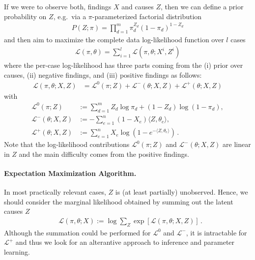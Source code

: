 \documentclass{article}
\newcommand{\loglike}{{\mathcal L}}
\begin{document}
If we were to observe both, findings $X$ and causes $Z$, then we can define a prior probability on $Z$, e.g.~via a $\pi$-parameterized factorial distribution 
\begin{align}
P(Z; \pi) = \prod_{d=1}^m \pi_d^{Z_d} (1-\pi_d)^{1-Z_d} 
\end{align}
and then aim to maximize the complete data log-likelihood function over $l$ cases
\begin{align}
\loglike(\pi,\theta) = \sum_{i=1}^l \loglike(\pi,\theta; X^i, Z^i)
\end{align}
where the per-case log-likelihood has three parts coming from the (i) prior over causes, (ii) negative findings, and (iii) positive findings as follows:  
\begin{align}
\label{eq:cond-log-like}
\loglike(\pi,\theta; X, Z)  & = \loglike^0(\pi; Z) + \loglike^-(\theta; X, Z) + \loglike^+(\theta; X, Z) 
\end{align}
with
\begin{align}
\loglike^0(\pi; Z) & :=  \sum_{d=1}^m Z_d \log \pi_d + (1-Z_d) \log (1-\pi_d), \nonumber  \\
\loglike^-(\theta; X, Z) & := -\sum_{e=1}^n (1-X_e)  \langle Z, \theta_{e} \rangle, \nonumber \\
\loglike^+(\theta; X,Z) & := \sum_{e=1}^n X_e \log \left( 1-  e^{-\langle Z, \theta_e \rangle} \right)\,. \nonumber
\end{align}
%
Note that the log-likelihood contributions $\loglike^0(\pi; Z)$ and $\loglike^-(\theta; X, Z)$ are linear in $Z$ and the main difficulty comes from the positive findings.

\paragraph{Expectation Maximization Algorithm.}

In most practically relevant cases, $Z$ is (at least partially) unobserved. Hence, we should consider the marginal likelihood obtained by summing out the latent causes $Z$
\begin{align}
& \loglike(\pi, \theta; X) := \log \sum_{Z} \exp\left[ \loglike(\pi, \theta; X, Z) \right]
\,.
\label{eq:marginal-loglike}
\end{align}
Although the summation could be performed for $\loglike^0$ and $ \loglike^-$, it is intractable for $\loglike^+$ and thus we look for an alterantive approach to inference and parameter learning. 
\end{document}
